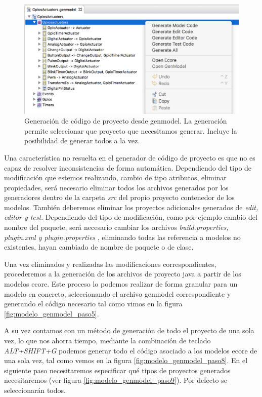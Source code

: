 \begin{figure}
	\centering
    \includegraphics[scale=0.4]{images/emf_capturas/genmodel_7.png}
    \sourcepropia{}
    \caption[Genmodel selección de proyectos a generar]{Generación de código de proyecto desde genmodel. La generación permite seleccionar que proyecto que necesitamos generar. Incluye la posibilidad de generar todos a la vez.}
    \label{fig:modelo_genmodel_paso7}
\end{figure}


Una característica no resuelta en el generador de código de proyecto es que no es capaz de resolver inconsistencias de forma automática. Dependiendo del tipo de modificación que estemos realizando, cambio de tipo atributos, eliminar propiedades, será necesario eliminar todos los archivos generados por los generadores dentro de la carpeta \textit{src} del propio proyecto contenedor de los modelos. También deberemos eliminar los proyectos adicionales generados de \textit{edit, editor y test}. Dependiendo del tipo de modificación, como por ejemplo cambio del nombre del paquete, será necesario cambiar los archivos \textit{build.properties, plugin.xml y plugin.properties} , eliminando todas las referencia a modelos no existentes, hayan cambiado de nombre de paquete o de clase.

Una vez eliminados y realizadas las modificaciones correspondientes, procederemos a la generación de los archivos de proyecto java a partir de los modelos \gls{ecore}. Este proceso lo podemos realizar de forma granular para un modelo en concreto, seleccionando el archivo genmodel correspondiente y generando el código necesario tal como vimos en la figura \ref{fig:modelo_genmodel_paso5}.

A su vez contamos con un método de generación de todo el proyecto de una sola vez, lo que nos ahorra tiempo, mediante la combinación de teclado \textit{ALT+SHIFT+G}  podemos generar todo el código asociado a los modelos \gls{ecore} de una sola vez, tal como vemos en la figura \ref{fig:modelo_genmodel_paso8}. En el siguiente paso necesitaremos especificar qué tipos de proyectos generados necesitaremos (ver figura \ref{fig:modelo_genmodel_paso9}). Por defecto se seleccionarán todos.


